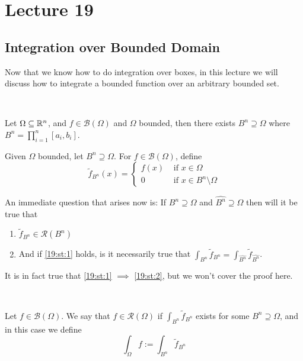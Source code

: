 \documentclass[../Analysis-3.tex]{subfiles}
\begin{document}
\chapter*{Lecture 19} %
\setcounter{chapter}{19} %
\setcounter{section}{0}

\section{Integration over Bounded Domain}

Now that we know how to do integration over boxes, in this lecture we will discuss how to integrate a bounded function over an arbitrary bounded set.

\

Let $\Omega \subseteq \mathbb{R}^n$, and $f \in \mathscr{B}(\Omega)$ and $\Omega$ bounded, then there exists $B^n \supseteq \Omega$ where $B^n = \prod_{i=1}^n [a_i, b_i]$.

\begin{Def}{}{}
  Given $\Omega$ bounded, let $B^n \supseteq \Omega$. For $f \in \mathscr{B}(\Omega)$, define
  \[
    \tilde{f}_{B^n}(x) = \begin{cases}
      f(x) & \mbox{ if } x \in \Omega               \\
      0    & \mbox{ if } x \in B^n \setminus \Omega
    \end{cases}
  \]
\end{Def}

An immediate question that arises now is: If $B^n \supseteq \Omega$ and $\hat{B^n} \supseteq \Omega$ then will it be true that
\begin{enumerate}[label=(\Roman*)]
  \item $\tilde{f}_{B^n} \in \mathscr{R}(B^n)$   \label{19:st:1}
  \item And if \ref{19:st:1} holds, is it necessarily true that $\displaystyle{\int_{B^n} \tilde{f}_{B^n} = \int_{\hat{B^n}} \tilde{f}_{\hat{B^n}}}$.  \label{19:st:2}
\end{enumerate}
It is in fact true that \ref{19:st:1} $\implies$ \ref{19:st:2}, but we won't cover the proof here.

\

\begin{Def}{}{}
  Let $f \in \mathscr{B}(\Omega)$. We say that $f \in \mathscr{R}(\Omega)$ if $\displaystyle\int_{B^n} \tilde{f}_{B^n}$ exists for some $B^n \supseteq \Omega$, and in this case we define
  \[
    \int_{\Omega} f := \int_{B^n} \tilde{f}_{B^n}
  \]
\end{Def}
\end{document}
